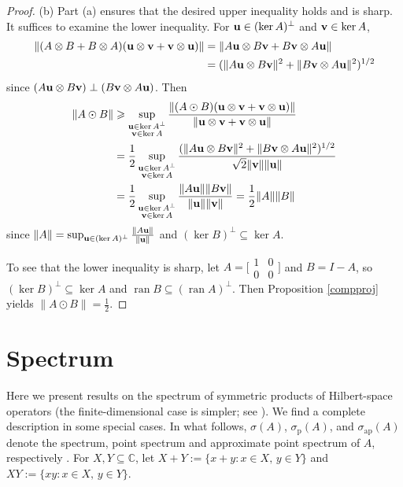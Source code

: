 \documentclass[10pt,reqno]{amsart}
\newcommand{\0}{{\color{lightgray}0}}
\newcommand{\C}{\mathbb{C}}
\renewcommand{\geq}{\geqslant}
\newcommand{\ran}{\operatorname{ran}}
\newcommand{\norm}[1]{\| #1 \|}
\renewcommand{\vec}[1]{{\bf #1}}
\theoremstyle{definition}
\numberwithin{equation}{section}
\begin{document}
\begin{proof}
\medskip\noindent(b)
Part (a) ensures that the desired upper inequality holds and is sharp.  It suffices to examine the lower inequality.
For $\vec{u}\in  (\ker A)^\perp$ and $\vec{v}\in \ker A$,
\begin{align}
\norm{(A\otimes B+B\otimes A)(\vec{u}\otimes \vec{v}+\vec{v}\otimes \vec{u})}
&= \norm{A\vec{u}\otimes B\vec{v} + B\vec{v}\otimes A\vec{u}}\\
&= (\norm{A\vec{u}\otimes B\vec{v}}^2 + \norm{B\vec{v}\otimes A\vec{u}}^2)^{1/2} 
\end{align}
since $(A\vec{u} \otimes B\vec{v}) \perp (B\vec{v}\otimes A\vec{u} )$.
Then 
\begin{align*}
\norm{A\odot B}
&\geq \sup_{\substack{\vec{u}\in \ker A^{\perp} \\ \vec{v} \in \ker A }}\frac{\norm{(A\odot B)(\vec{u}\otimes \vec{v}+\vec{v}\otimes \vec{u})}}{\norm{\vec{u}\otimes \vec{v}+\vec{v}\otimes \vec{u}}}\\
&= \frac{1}{2}\sup_{\substack{\vec{u}\in \ker A^{\perp} \\ \vec{v} \in \ker A}}\frac{(\norm{A\vec{u}\otimes B\vec{v}}^2+\norm{B\vec{v}\otimes A\vec{u}}^2)^{1/2}}{\sqrt{2}\norm{\vec{v}}\norm{\vec{u}}}\\
&= \frac{1}{2} \sup_{\substack{\vec{u}\in \ker A^{\perp} \\ \vec{v} \in \ker A }}
\frac{ \|A\vec{u} \| \| B\vec{v} \|}{\norm{\vec{u}}\norm{\vec{v}}}
=\frac{1}{{2}}\norm{A}\norm{B}
\end{align*}
since $\norm{A}=\sup_{\vec{u}\in  (\ker A)^\perp}\frac{\norm{A\vec{u}}}{\norm{\vec{u}}}$ and $(\ker B)^\perp \subseteq \ker A$.

To see that the lower inequality is sharp,
let $A = \big[ \begin{smallmatrix}
1 & 0 \\
0 & 0
\end{smallmatrix}\big]$ and $ B = I - A$, so
$(\ker B)^\perp \subseteq \ker A$ and $\ran B \subseteq (\ran A)^\perp$. 
Then Proposition \ref{compproj} yields $\norm{A \odot B} = \frac{1}{2}$.
\end{proof}



\section{Spectrum}\label{Section:Spectrum}
Here we present results on the spectrum of symmetric products of Hilbert-space operators
(the finite-dimensional case is simpler; see \cite[p.~18]{Bhatia}).
We find a complete description in some special cases.
In what follows, $\sigma(A)$, $\sigma_{\textrm{p}}(A)$, and $\sigma_{\textrm{ap}}(A)$ denote the spectrum, point spectrum
and approximate point spectrum of $A$, respectively \cite[Def.~2.4.5]{OTBE}.
For $X, Y \subseteq \C$, let $X + Y := \{ x+y : x \in X, \, y \in Y \}$ and $XY := \{ xy :  x \in X, \, y \in Y \}$.
\end{document}
